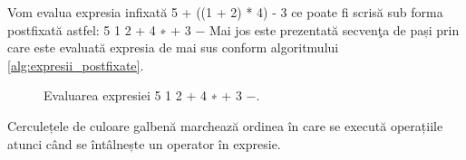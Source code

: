 Vom evalua expresia infixată 5 + ((1 + 2) * 4) - 3 ce poate fi scrisă sub forma
postfixată astfel:
 5 1 2 + 4 ∗ + 3 −
Mai jos este prezentată secvenţa de pași prin care este evaluată expresia de mai sus
conform algoritmului \ref{alg:expresii_postfixate}.

\begin{figure}[H] 
	\centering	
	{
	}
	\caption{Evaluarea expresiei  5 1 2 + 4 ∗ + 3 −.} 
	\label{fig:stackpostfix}
\end{figure}

Cerculețele de culoare galbenă marchează ordinea în care se execută operațiile atunci când se întâlnește un operator în expresie. 





